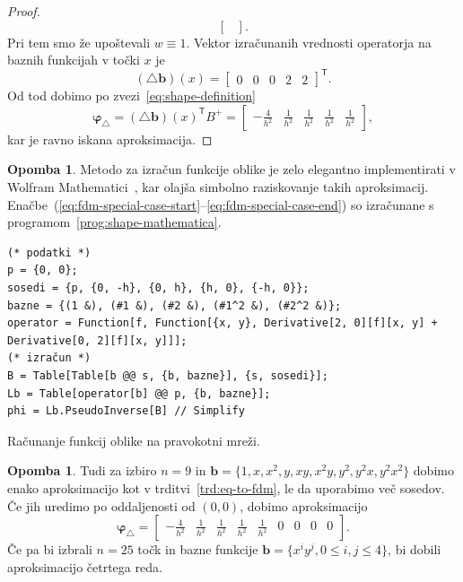 \documentclass[12pt,a4paper,twoside]{article}
\theoremstyle{definition} %
\newtheorem{opomba}[definicija]{Opomba}
\theoremstyle{plain} %
\numberwithin{equation}{section}
\newcommand{\T}{\mathsf{T}}
\newcommand{\lap}{\triangle}
\renewcommand{\b}{\boldsymbol}
\renewcommand{\phi}{\varphi}
\begin{document}
\begin{proof}
\begin{equation}
\begin{bmatrix}
  \end{bmatrix}.
\end{equation}
Pri tem smo že upoštevali $w \equiv 1$.
Vektor izračunanih vrednosti operatorja na baznih funkcijah v točki $x$ je
\begin{equation}
   (\lap \b{b})(x) = \begin{bmatrix} 0 & 0 & 0 & 2 & 2 \end{bmatrix}^\T.
\end{equation}
Od tod dobimo po zvezi~\eqref{eq:shape-definition}
\begin{equation}
  \label{eq:fdm-special-case-end}
  \b\phi_\lap = (\lap \b b)(x)^\T B^{+} =
  \begin{bmatrix}
    -\frac{4}{h^2} & \frac{1}{h^2} & \frac{1}{h^2} & \frac{1}{h^2} &
    \frac{1}{h^2}
  \end{bmatrix},
\end{equation}
kar je ravno iskana aproksimacija.
\end{proof}
\begin{opomba}
  Metodo za izračun funkcije oblike je zelo elegantno implementirati v
  Wolfram Mathematici~\cite{mathematica}, kar olajša simbolno raziskovanje takih aproksimacij.
  Enačbe~(\ref{eq:fdm-special-case-start}--\ref{eq:fdm-special-case-end}) so izračunane s
  programom~\ref{prog:shape-mathematica}.

\begin{listing}[!h]
    \vspace{-1ex}
  \begin{verbatim}
(* podatki *)
p = {0, 0};
sosedi = {p, {0, -h}, {0, h}, {h, 0}, {-h, 0}};
bazne = {(1 &), (#1 &), (#2 &), (#1^2 &), (#2^2 &)};
operator = Function[f, Function[{x, y}, Derivative[2, 0][f][x, y] + Derivative[0, 2][f][x, y]]];
(* izračun *)
B = Table[Table[b @@ s, {b, bazne}], {s, sosedi}];
Lb = Table[operator[b] @@ p, {b, bazne}];
phi = Lb.PseudoInverse[B] // Simplify
  \end{verbatim}
  \vspace{-3ex}
  \caption{Računanje funkcij oblike na pravokotni mreži.}
  \label{prog:shape-mathematica}
  \end{listing}
\end{opomba}
\begin{opomba}
  \label{op:fdm-9}
  Tudi za izbiro $n=9$ in $\b b = \{1, x, x^2, y, xy, x^2y, y^2, y^2x, y^2
  x^2 \}$ dobimo enako aproksimacijo kot v trditvi~\ref{trd:eq-to-fdm}, le da
  uporabimo več sosedov. Če jih uredimo po oddaljenosti od $(0, 0)$, dobimo
  aproksimacijo
  \begin{equation}
    \b\phi_\lap =  \begin{bmatrix}
    -\frac{4}{h^2} & \frac{1}{h^2} & \frac{1}{h^2} & \frac{1}{h^2} &
    \frac{1}{h^2} & 0 & 0 & 0 & 0
  \end{bmatrix}.
    \label{eq:shape-mon9}
  \end{equation}
 Če pa bi izbrali $n=25$ točk in bazne funkcije $\b b = \{x^iy^j, 0 \leq i, j
 \leq 4 \}$, bi dobili aproksimacijo četrtega reda.
\end{opomba}
\end{document}
